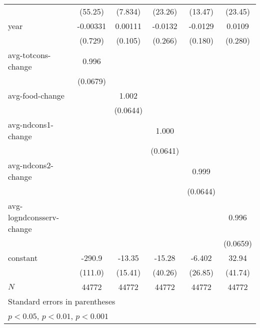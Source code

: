 \begin{table}[htbp]
\begin{tabular}{l*{5}{c}}
            &     (55.25)         &     (7.834)         &     (23.26)         &     (13.47)         &     (23.45)         \\
year        &    -0.00331         &     0.00111         &     -0.0132         &     -0.0129         &      0.0109         \\
            &     (0.729)         &     (0.105)         &     (0.266)         &     (0.180)         &     (0.280)         \\
avg-totcons-change&       0.996\sym{***}&                     &                     &                     &                     \\
            &    (0.0679)         &                     &                     &                     &                     \\
avg-food-change&                     &       1.002\sym{***}&                     &                     &                     \\
            &                     &    (0.0644)         &                     &                     &                     \\
avg-ndcons1-change&                     &                     &       1.000\sym{***}&                     &                     \\
            &                     &                     &    (0.0641)         &                     &                     \\
avg-ndcons2-change&                     &                     &                     &       0.999\sym{***}&                     \\
            &                     &                     &                     &    (0.0644)         &                     \\
avg-logndconsserv-change&                     &                     &                     &                     &       0.996\sym{***}\\
            &                     &                     &                     &                     &    (0.0659)         \\
constant    &      -290.9\sym{**} &      -13.35         &      -15.28         &      -6.402         &       32.94         \\
            &     (111.0)         &     (15.41)         &     (40.26)         &     (26.85)         &     (41.74)         \\
\hline
\(N\)       &       44772         &       44772         &       44772         &       44772         &       44772         \\
\hline\hline
\multicolumn{6}{l}{\footnotesize Standard errors in parentheses}\\
\multicolumn{6}{l}{\footnotesize \sym{*} \(p<0.05\), \sym{**} \(p<0.01\), \sym{***} \(p<0.001\)}\\
\end{tabular}
\end{table}
